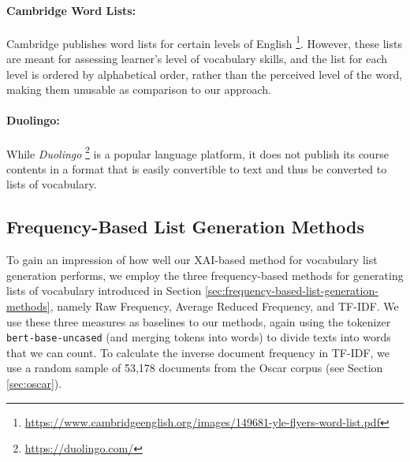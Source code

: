 \paragraph{Cambridge Word Lists:}
Cambridge publishes word lists for certain levels of English \footnote{\url{https://www.cambridgeenglish.org/images/149681-yle-flyers-word-list.pdf}}.
However, these lists are meant for assessing learner's level of vocabulary skills, and the list for each level is ordered by alphabetical order, rather than the perceived level of the word, making them unusable as comparison to our approach.

\paragraph{Duolingo:}
While \textit{Duolingo} \footnote{\url{https://duolingo.com/}} is a popular language platform, it does not publish its course contents in a format that is easily convertible to text and thus be converted to lists of vocabulary.

%


\subsection{Frequency-Based List Generation Methods} \label{sec:freq-generation-methods-baselines}
To gain an impression of how well our XAI-based method for vocabulary list generation performs, we employ the three frequency-based methods for generating lists of vocabulary introduced in Section \ref{sec:frequency-based-list-generation-methods}, namely Raw Frequency, Average Reduced Frequency, and TF-IDF.
We use these three measures as baselines to our methods, again using the tokenizer \texttt{bert-base-uncased} (and merging tokens into words) to divide texts into words that we can count.
To calculate the inverse document frequency in TF-IDF, we use a random sample of 53,178 documents from the Oscar corpus (see Section \ref{sec:oscar}).

